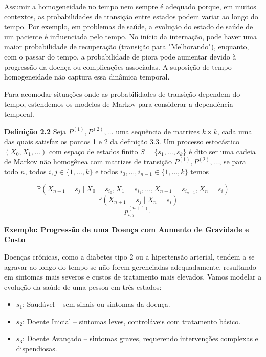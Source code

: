 \documentclass[12pt]{article}
\theoremstyle{break}
\begin{document}
Assumir a homogeneidade no tempo nem sempre é adequado porque, em muitos contextos, as probabilidades de transição entre estados podem variar ao longo do tempo. Por exemplo, em problemas de saúde, a evolução do estado de saúde de um paciente é influenciada pelo tempo. No início da internação, pode haver uma maior probabilidade de recuperação (transição para "Melhorando"), enquanto, com o passar do tempo, a probabilidade de piora pode aumentar devido à progressão da doença ou complicações associadas. A suposição de tempo-homogeneidade não captura essa dinâmica temporal.


Para acomodar situações onde as probabilidades de transição dependem do tempo, estendemos os modelos de Markov para considerar a dependência temporal.


\textbf{Definição 2.2} Seja $P^{(1)}, P^{(2)}, \dots$ uma sequência de matrizes $k \times k$, cada uma das quais satisfaz os pontos 1 e 2 da definição 3.3. Um processo estocástico $(X_0, X_1, \dots)$ com espaço de estados finito $S = \{s_1, \dots, s_k\}$ é dito ser uma cadeia de Markov não homogênea com matrizes de transição $P^{(1)}, P^{(2)}, \dots$, se para todo $n$, todos $i, j \in \{1, \dots, k\}$ e todos $i_0, \dots, i_{n-1} \in \{1, \dots, k\}$ temos

\[
\mathbb{P}(X_{n+1} = s_j \mid X_0 = s_{i_0}, X_1 = s_{i_1}, \dots, X_{n-1} = s_{i_{n-1}}, X_n = s_i)
\]
\[
= \mathbb{P}(X_{n+1} = s_j \mid X_n = s_i)
\]
\[
= p^{(n+1)}_{i,j}.
\]



\textbf{Exemplo: Progressão de uma Doença com Aumento de Gravidade e Custo}


Doenças crônicas, como a diabetes tipo 2 ou a hipertensão arterial, tendem a se agravar ao longo do tempo se não forem gerenciadas adequadamente, resultando em sintomas mais severos e custos de tratamento mais elevados. Vamos modelar a evolução da saúde de uma pessoa em três estados:


\begin{itemize}
    \item \( s_1 \): Saudável – sem sinais ou sintomas da doença.

    \item \( s_2 \): Doente Inicial – sintomas leves, controláveis com tratamento básico.

    \item \( s_3 \): Doente Avançado – sintomas graves, requerendo intervenções complexas e dispendiosas.
\end{itemize}
\end{document}
